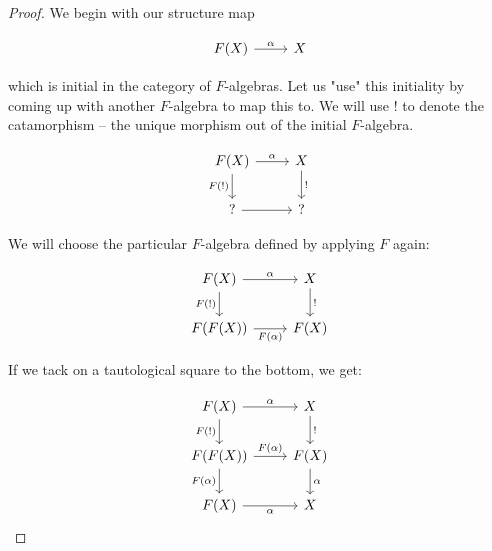 \begin{proof}
  We begin with our structure map

    \[\begin{tikzcd}
        {F(X)} & X
        \arrow["\alpha", from=1-1, to=1-2]
    \end{tikzcd}\]

  which is initial in the category of $F$-algebras.
  Let us "use" this initiality by coming up with another $F$-algebra to map this to.
  We will use $!$ to denote the catamorphism -- the unique morphism out of the initial $F$-algebra.

    \[\begin{tikzcd}
        {F(X)} & X \\
        {?} & {?}
        \arrow["\alpha", from=1-1, to=1-2]
        \arrow["{F(!)}"', from=1-1, to=2-1]
        \arrow["{!}", from=1-2, to=2-2]
        \arrow[from=2-1, to=2-2]
    \end{tikzcd}\]

  We will choose the particular $F$-algebra defined by applying $F$ again:
  
    \[\begin{tikzcd}
        {F(X)} & X \\
        {F(F(X))} & {F(X)}
        \arrow["\alpha", from=1-1, to=1-2]
        \arrow["{F(!)}"', from=1-1, to=2-1]
        \arrow["{!}", from=1-2, to=2-2]
        \arrow["{F(\alpha)}"', from=2-1, to=2-2]
    \end{tikzcd}\]

  If we tack on a tautological square to the bottom, we get:

    \[\begin{tikzcd}
        {F(X)} & X \\
        {F(F(X))} & {F(X)} \\
        {F(X)} & X
        \arrow["\alpha", from=1-1, to=1-2]
        \arrow["{F(!)}"', from=1-1, to=2-1]
        \arrow["{!}", from=1-2, to=2-2]
        \arrow["{F(\alpha)}", from=2-1, to=2-2]
        \arrow["{F(\alpha)}"', from=2-1, to=3-1]
        \arrow["\alpha", from=2-2, to=3-2]
        \arrow["\alpha"', from=3-1, to=3-2]
    \end{tikzcd}\]


\end{proof}
